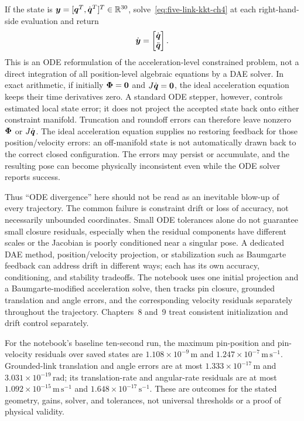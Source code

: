 \documentclass[../main.tex]{subfiles}
\begin{document}
	If the state is $\boldsymbol{y}=[\boldsymbol{q}^T,\dot{\boldsymbol{q}}^{T}]^T\in\mathbb R^{30}$, solve~\eqref{eq:five-link-kkt-ch4} at each right-hand-side evaluation and return
	\begin{equation}
	\dot{\boldsymbol{y}}=\begin{bmatrix}\dot{\boldsymbol{q}}\\\ddot{\boldsymbol{q}}\end{bmatrix}.
	\label{eq:five-link-ode-ch4}
	\end{equation}
	This is an ODE reformulation of the acceleration-level constrained problem, not a direct integration of all position-level algebraic equations by a DAE solver. In exact arithmetic, if initially $\boldsymbol{\Phi}=\boldsymbol{0}$ and $J\dot{\boldsymbol{q}}=\boldsymbol{0}$, the ideal acceleration equation keeps their time derivatives zero. A standard ODE stepper, however, controls estimated local state error; it does not project the accepted state back onto either constraint manifold. Truncation and roundoff errors can therefore leave nonzero $\boldsymbol{\Phi}$ or $J\dot{\boldsymbol{q}}$. The ideal acceleration equation supplies no restoring feedback for those position/velocity errors: an off-manifold state is not automatically drawn back to the correct closed configuration. The errors may persist or accumulate, and the resulting pose can become physically inconsistent even while the ODE solver reports success.

	Thus “ODE divergence” here should not be read as an inevitable blow-up of every trajectory. The common failure is constraint drift or loss of accuracy, not necessarily unbounded coordinates. Small ODE tolerances alone do not guarantee small closure residuals, especially when the residual components have different scales or the Jacobian is poorly conditioned near a singular pose. A dedicated DAE method, position/velocity projection, or stabilization such as Baumgarte feedback can address drift in different ways; each has its own accuracy, conditioning, and stability tradeoffs. The notebook uses one initial projection and a Baumgarte-modified acceleration solve, then tracks pin closure, grounded translation and angle errors, and the corresponding velocity residuals separately throughout the trajectory. Chapters~8 and~9 treat consistent initialization and drift control separately.

	For the notebook's baseline ten-second run, the maximum pin-position and pin-velocity residuals over saved states are $1.108\times10^{-9}\,\mathrm m$ and $1.247\times10^{-7}\,\mathrm{m\,s^{-1}}$. Grounded-link translation and angle errors are at most $1.333\times10^{-17}\,\mathrm m$ and $3.031\times10^{-19}\,\mathrm{rad}$; its translation-rate and angular-rate residuals are at most $1.092\times10^{-15}\,\mathrm{m\,s^{-1}}$ and $1.648\times10^{-17}\,\mathrm{s^{-1}}$. These are outcomes for the stated geometry, gains, solver, and tolerances, not universal thresholds or a proof of physical validity.
\end{document}
